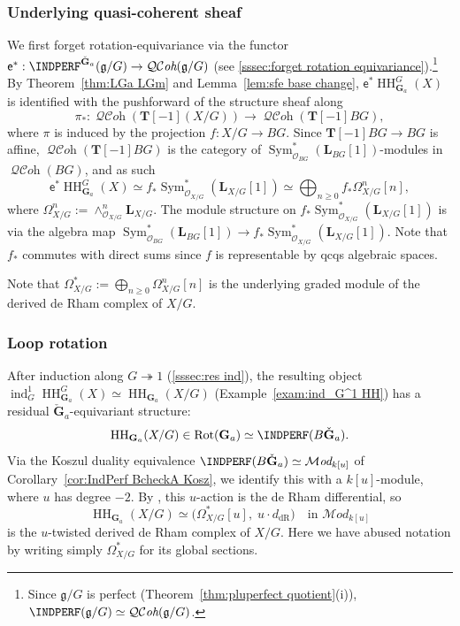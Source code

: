 \documentclass[12pt, oneside]{amsart}
\numberwithin{equation}{section}
\theoremstyle{remark}
\theoremstyle{plain}
\renewcommand{\ge}{\geqslant}
\newcommand{\MOD}{\mathcal{M}\textit{od}}
\DeclareMathOperator{\QCOH}{\mathcal{QC}\textit{oh}}
\newcommand{\OO}{\mathcal{O}}
\newcommand{\GG}{\mathbf{G}}
\newcommand{\GGa}{\mathbf{G}_{a}}
\newcommand{\TT}{\mathbf{T}}
\newcommand{\HH}{\operatorname{HH}}
\DeclareMathOperator{\Sym}{Sym}
\newcommand{\sfe}{\mathsf{e}}
\newcommand{\Rot}{\operatorname{Rot}}
\begin{document}
\subsubsection{Underlying quasi-coherent sheaf}

We first forget rotation-equivariance via the functor $\sfe^* : \INDPERF^{\check{\GG}_a}(\mathfrak{g}/G) \to \QCOH(\mathfrak{g}/G)$ (see \ref{sssec:forget rotation equivariance}).\footnote{%
  Since $\mathfrak{g}/G$ is perfect (Theorem~\ref{thm:pluperfect quotient}(i)), $\INDPERF(\mathfrak{g}/G) \simeq \QCOH(\mathfrak{g}/G)$.
}
By Theorem~\ref{thm:LGa LGm} and Lemma~\ref{lem:sfe base change}, $\sfe^* \HH_{\GGa}^G(X)$ is identified with the pushforward of the structure sheaf along
\[
  \pi_* : \QCOH(\TT[-1](X/G)) \to \QCOH(\TT[-1]BG),
\]
where $\pi$ is induced by the projection $f : X/G \to BG$.
Since $\TT[-1]BG \to BG$ is affine, $\QCOH(\TT[-1]BG)$ is the category of $\Sym^*_{\OO_{BG}}(\mathbf{L}_{BG}[1])$-modules in $\QCOH(BG)$, and as such
\[ \sfe^* \HH_{\GGa}^G(X) \simeq f_*\Sym^*_{\OO_{X/G}}(\mathbf{L}_{X/G}[1]) \simeq \bigoplus_{n \ge 0} f_*\Omega^n_{X/G}[n], \]
where $\Omega^n_{X/G} := \wedge^n_{\OO_{X/G}}\mathbf{L}_{X/G}$.
The module structure on $f_*\Sym^*_{\OO_{X/G}}(\mathbf{L}_{X/G}[1])$ is via the algebra map $\Sym^*_{\OO_{BG}}(\mathbf{L}_{BG}[1]) \to f_*\Sym^*_{\OO_{X/G}}(\mathbf{L}_{X/G}[1])$.
Note that $f_*$ commutes with direct sums since $f$ is representable by qcqs algebraic spaces.

Note that $\Omega^*_{X/G} := \bigoplus_{n \ge 0} \Omega^n_{X/G}[n]$ is the underlying graded module of the derived de Rham complex of $X/G$.

\subsubsection{Loop rotation}

After induction along $G \twoheadrightarrow 1$ (\ref{sssec:res ind}), the resulting object $\operatorname{ind}_G^1\HH_{\GGa}^G(X) \simeq \HH_{\GGa}(X/G)$ (Example~\ref{exam:ind_G^1 HH}) has a residual $\check{\GG}_a$-equivariant structure:
\[\HH_{\GGa}(X/G) \in \Rot(\GGa) \simeq \INDPERF(B\check{\GG}_a).\]
Via the Koszul duality equivalence $\INDPERF(B\check{\GG}_a) \simeq \MOD_{k[u]}$ of Corollary~\ref{cor:IndPerf BcheckA Kosz}, we identify this with a $k[u]$-module, where $u$ has degree $-2$.
By \cite[Thm.~1.3]{BNloop}, this $u$-action is the de Rham differential, so
\[ \HH_{\GGa}(X/G) \simeq \bigl(\Omega^*_{X/G}[u],\; u \cdot d_{\mathrm{dR}}\bigr) \quad\text{in } \MOD_{k[u]} \]
is the $u$-twisted derived de Rham complex of $X/G$.
Here we have abused notation by writing simply $\Omega^*_{X/G}$ for its global sections.
\end{document}
